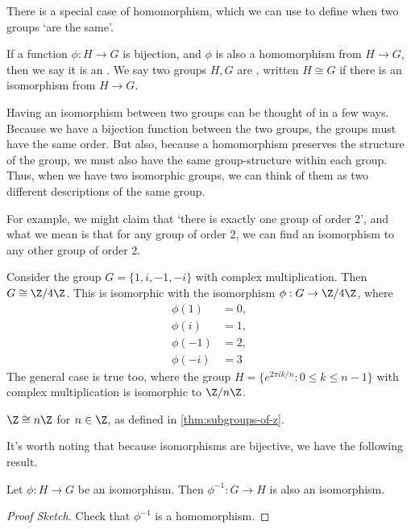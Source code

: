 \documentclass[a4paper]{scrartcl}
\begin{document}
There is a special case of homomorphism, which we can use to define when two groups `are the same'.

\begin{definition}[Isomorphism]
	If a function $\phi : H \rightarrow G$ is bijection, and $\phi$ is also a homomorphism from $H \rightarrow G$, then we say it is an . We say two groups $H, G$ are , written $H \cong G$ if there is an isomorphism from $H \rightarrow G$.
\end{definition}

Having an isomorphism between two groups can be thought of in a few ways. Because we have a bijection function between the two groups, the groups must have the same order. But also, because a homomorphism preserves the structure of the group, we must also have the same group-structure within each group. Thus, when we have two isomorphic groups, we can think of them as two different descriptions of the same group.

For example, we might claim that `there is exactly one group of order 2', and what we mean is that for any group of order 2, we can find an isomorphism to any other group of order 2. 

\begin{example}
	Consider the group $G = \{ 1, i, -1, -i \}$ with complex multiplication. Then $G \cong \Z / 4 \Z$. This is isomorphic with the isomorphism $\phi : G \rightarrow \Z / 4 \Z$, where
	\begin{align*}
		\phi(1) &= 0, \\
		\phi(i) &= 1, \\
		\phi(-1) &= 2, \\
		\phi(-i) &= 3
	\end{align*}
	The general case is true too, where the group $H = \{  e^{2 \pi i k/n} : 0 \leq k \leq n - 1 \}$ with complex multiplication is isomorphic to $\Z /n \Z$.
\end{example}

\begin{example}
	$\Z \cong n \Z$ for $n \in \Z$, as defined in \autoref{thm:subgroups-of-z}. 
\end{example}

It's worth noting that because isomorphisms are bijective, we have the following result.

\begin{proposition}
	Let $\phi : H \rightarrow G$ be an isomorphism. Then $\phi^{-1} : G \rightarrow H$ is also an isomorphism.
\end{proposition}
\begin{proof}[Proof Sketch]
	Check that $\phi^{-1}$ is a homomorphism.
\end{proof}
\end{document}

